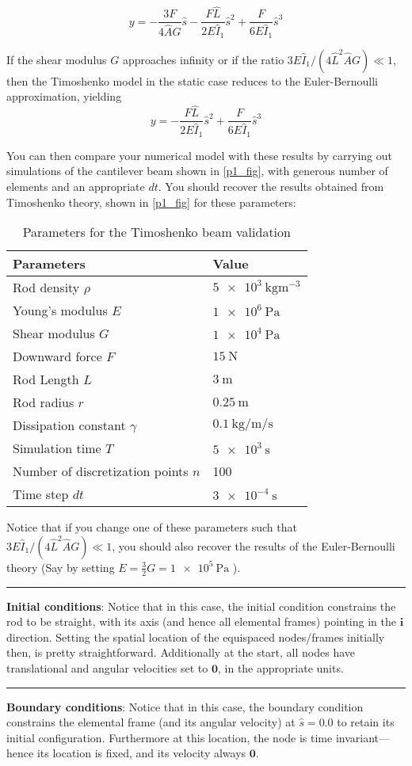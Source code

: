 \documentclass[11pt]{article}
\begin{document}
\begin{enumerate}
\[ y=-\frac{3F}{4\hat{A}G}\hat{s} -
	 \frac{F\hat{L}}{2E\hat{I}_1}\hat{s}^2 + \frac{F}{6E\hat{I}_1}\hat{s}^3 \]

If the shear modulus \(G\) approaches infinity or if the ratio
\(3E\hat{I}_1/(4\hat{L}^2\hat{A}G)\ll 1\), then the Timoshenko model in the
static case reduces to the Euler-Bernoulli approximation, yielding
\[ y= - \frac{F\hat{L}}{2E\hat{I}_1}\hat{s}^2 +
	 \frac{F}{6E\hat{I}_1}\hat{s}^3 \]

You can then compare your numerical model with these results by carrying out
simulations of the cantilever beam shown in \cref{p1_fig}, with generous number
of elements and an appropriate \(dt\). You should recover the results
obtained from Timoshenko theory, shown in \cref{p1_fig} for these parameters:

\begin{table}[htbp]
\caption{\label{timoshenko_params}
Parameters for the Timoshenko beam validation}
\centering
\begin{tabular}{ll}
\toprule
Parameters & Value\\
\midrule
Rod density \(\rho\) & \(\SI{5e3}{\kg \m^{-3}}\)\\
Young's modulus \(E\) & \(\SI{1e6}{\Pa}\)\\
Shear modulus \(G\) & \(\SI{1e4}{\Pa}\)\\
Downward force \(F\) & \(\SI{15}{\N}\)\\
Rod Length \(L\) & \(\SI{3}{\m}\)\\
Rod radius \(r\) & \(\SI{0.25}{\m}\)\\
Dissipation constant \(\gamma\) & \(\SI{0.1}{\kg\per\m\per\second}\)\\
Simulation time \(T\) & \(\SI{5e3}{\second}\)\\
Number of discretization points \(n\) & 100\\
Time step \(dt\) & \(\SI{3e-4}{\second}\)\\
\bottomrule
\end{tabular}
\end{table}

Notice that if you change one of these parameters such that \(3E\hat{I}_1/(4\hat{L}^2\hat{A}G)\ll 1\), you should also recover the
results of the Euler-Bernoulli theory (Say by setting \(E = \frac{3}{2}G = \SI{1e5}{\Pa}\) ).

\noindent\rule{1\textwidth}{0.01pt}
\textbf{Initial conditions}: Notice that in this case, the initial
condition constrains the rod to be straight, with its axis (and hence all
elemental frames) pointing in the \(\mathbf{i}\) direction. Setting the spatial location
of the equispaced nodes/frames initially then, is pretty straightforward. Additionally at the
start, all nodes have translational and angular velocities set to \(\mathbf{0}\), in the
appropriate units.

\noindent\rule{1\textwidth}{0.01pt}
\textbf{Boundary conditions}: Notice that in this case, the boundary
condition constrains the elemental frame (and its angular velocity) at \(\hat{s} = 0.0\) to retain its initial configuration. Furthermore at this
location, the node is time invariant---hence its location is fixed, and its
velocity always \(\mathbf{0}\).
\end{enumerate}
\end{document}

